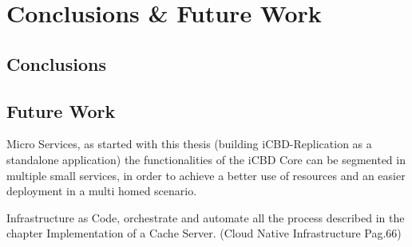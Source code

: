 \chapter{Conclusions \& Future Work}
\label{cha:conclusion}

\section{Conclusions}
\label{sec:conclusions}

\section{Future Work}
\label{sec:future_work}

Micro Services, as started with this thesis (building iCBD-Replication as a standalone application) the functionalities of the iCBD Core can be segmented in multiple small services, in order to achieve a better use of resources and an easier deployment in a multi homed scenario.

Infrastructure as Code, orchestrate and automate all the process described in the chapter Implementation of a Cache Server. (Cloud Native Infrastructure Pag.66)

